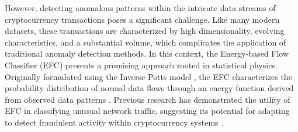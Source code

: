 \documentclass[12pt]{article}
\begin{document}
However, detecting anomalous patterns within the intricate data streams of cryptocurrency transactions poses a significant
challenge. Like many modern datasets, these transactions are characterized by high dimensionality, evolving characteristics,
and a substantial volume, which complicates the application of traditional anomaly detection methods. In this context, the
Energy-based Flow Classifier (EFC) presents a promising approach rooted in statistical physics. Originally formulated using
the Inverse Potts model \cite{pontes2019}, the EFC characterizes the probability distribution of normal data flows through
an energy function derived from observed data patterns \cite{pontes2019}. Previous research has demonstrated the utility
of EFC in classifying unusual network traffic, suggesting its potential for adapting to detect fraudulent activity within
cryptocurrency systems \cite{pontes2019, souza2022novelopensetenergybased}.
\end{document}

